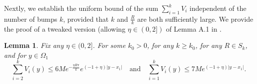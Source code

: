 \documentclass{amsart}
\newtheorem{lemma}[theorem]{Lemma}
\theoremstyle{definition}
\theoremstyle{remark}
\numberwithin{equation}{section}
\begin{document}
 
 



Nextly, we  establish the uniform bound of the sum $\displaystyle \sum_{i=1}^k V_{i}$ independent of the number of bumps $k$, provided that $k$ and $\frac{R}{k}$ are both sufficiently large. We provide the proof of a tweaked version (allowing $\eta \in (0,2])$ of Lemma A.1 in \cite{wei_yan_2014}.

\begin{lemma}\label{ksum}  \cite[Lemma A.1]{wei_yan_2014} Fix any $\eta \in (0,2]$. For some $k_0>0$, for any $k\ge k_0$, for any $R \in S_k$, and for $y \in{\Omega}_1$
\begin{equation} \label{ksumest} \displaystyle \sum_{i=2}^k V_{i}(y) \le 6Me^{-\frac{\eta R\pi }{k}} e^{(-1+\eta)|y-x_1|}\quad \text{and} \quad \displaystyle \sum_{i=1}^k V_{i}(y) \le 7Me^{(-1+\eta)|y-x_1|}.
\end{equation}

\end{lemma}
\end{document}
